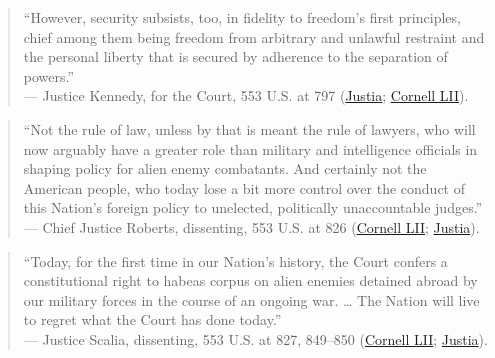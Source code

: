 \documentclass[12pt]{article}
\begin{document}
\begin{quote}
``However, security subsists, too, in fidelity to freedom's first principles, chief among them being freedom from arbitrary and unlawful restraint and the personal liberty that is secured by adherence to the separation of powers.'' \\
--- Justice Kennedy, for the Court, 553 U.S. at 797 (\href{https://supreme.justia.com/cases/federal/us/553/723/}{Justia}; \href{https://www.law.cornell.edu/supct/html/06-1195.ZS.html}{Cornell LII}).
\end{quote}

\begin{quote}
``Not the rule of law, unless by that is meant the rule of lawyers, who will now arguably have a greater role than military and intelligence officials in shaping policy for alien enemy combatants. And certainly not the American people, who today lose a bit more control over the conduct of this Nation's foreign policy to unelected, politically unaccountable judges.'' \\
--- Chief Justice Roberts, dissenting, 553 U.S. at 826 (\href{https://www.law.cornell.edu/supct/html/06-1195.ZD.html}{Cornell LII}; \href{https://supreme.justia.com/cases/federal/us/553/723/}{Justia}).
\end{quote}

\begin{quote}
``Today, for the first time in our Nation's history, the Court confers a constitutional right to habeas corpus on alien enemies detained abroad by our military forces in the course of an ongoing war. \ldots{} The Nation will live to regret what the Court has done today.'' \\
--- Justice Scalia, dissenting, 553 U.S. at 827, 849--850 (\href{https://www.law.cornell.edu/supct/html/06-1195.ZD1.html}{Cornell LII}; \href{https://supreme.justia.com/cases/federal/us/553/723/}{Justia}).
\end{quote}
\end{document}
